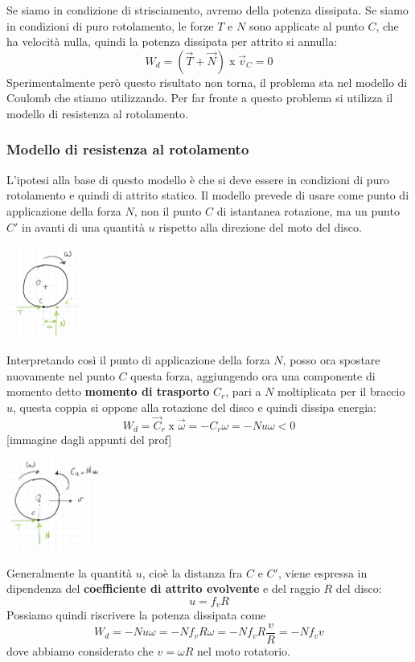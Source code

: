 \newline
Se siamo in condizione di strisciamento, avremo della potenza dissipata.\newline
Se siamo in condizioni di puro rotolamento, le forze $T$ e $N$ sono applicate al punto $C$, che ha velocità nulla, quindi la potenza dissipata per attrito si annulla:
\[
    W_d = (\vec{T} + \vec{N}) \;\text{x}\; \vec{v}_C = 0
\]
Sperimentalmente però questo risultato non torna, il problema sta nel modello di Coulomb che stiamo utilizzando. Per far fronte a questo problema si utilizza il modello di resistenza al rotolamento.
\subsubsection*{Modello di resistenza al rotolamento}
L'ipotesi alla base di questo modello è che si deve essere in condizioni di puro rotolamento e quindi di attrito statico. Il modello prevede di usare come punto di applicazione della forza $N$, non il punto $C$ di istantanea rotazione, ma un punto $C'$ in avanti di una quantità $u$ rispetto alla direzione del moto del disco.
\begin{center}
    \includegraphics[height=3cm]{../lezione11/img10.JPG}
\end{center}
Interpretando così il punto di applicazione della forza $N$, posso ora spostare nuovamente nel punto $C$ questa forza, aggiungendo ora una componente di momento detto \textbf{momento di trasporto} $C_r$, pari a $N$ moltiplicata per il braccio $u$, questa coppia si oppone alla rotazione del disco e quindi dissipa energia:
\[
    W_d = \vec{C}_r \;\text{x}\; \vec{\omega} = -C_r \omega = - N u \omega < 0
\]
[immagine dagli appunti del prof]
\begin{center}
    \includegraphics[height=3cm]{../lezione11/img11.JPG}
\end{center}
Generalmente la quantità $u$, cioè la distanza fra $C$ e $C'$, viene espressa in dipendenza del \textbf{coefficiente di attrito evolvente} e del raggio $R$ del disco:
\[
    u = f_v R
\]
Possiamo quindi riscrivere la potenza dissipata come
\[
    W_d = - N u \omega = - N f_v R \omega = - N f_v R \frac{v}{R} = - N f_v v
\]
dove abbiamo considerato che $v = \omega R$ nel moto rotatorio.
